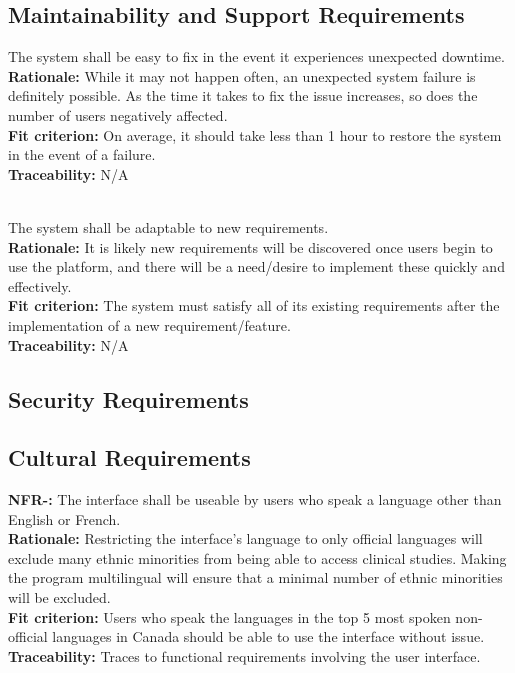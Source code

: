 \documentclass[12pt, titlepage]{article}
\newcounter{NFR_Counter}
\newcounter{FR_Counter}
\begin{document}
\subsection{Maintainability and Support Requirements}


The system shall be easy to fix in the event it experiences unexpected downtime.\\
\textbf{Rationale:}
While it may not happen often, an unexpected system failure is definitely possible. As the time it takes 
to fix the issue increases, so does the number of users negatively affected.\\
\textbf{Fit criterion:}
On average, it should take less than 1 hour to restore the system in the event of a failure.\\
\textbf{Traceability:}
N/A \\~\\
\addtocounter{NFR_Counter}{1}


The system shall be adaptable to new requirements.\\
\textbf{Rationale:}
It is likely new requirements will be discovered once users begin to use the platform, and there will be a need/desire to 
implement these quickly and effectively.\\
\textbf{Fit criterion:}
The system must satisfy all of its existing requirements after the implementation of a new requirement/feature.\\
\textbf{Traceability:}
N/A
\addtocounter{NFR_Counter}{1}


\subsection{Security Requirements}

\subsection{Cultural Requirements}
\noindent\textbf{NFR-\the\value{NFR_Counter}:}
The interface shall be useable by users who speak a language other than English or French.  \\
\textbf{Rationale:}
Restricting the interface's language to only official languages will exclude many ethnic minorities from being able to access clinical studies. Making the program multilingual will ensure that a minimal number of ethnic minorities will be excluded. \\
\textbf{Fit criterion:}
Users who speak the languages in the top 5 most spoken non-official languages in Canada should be able to use the interface without issue. \\
\textbf{Traceability:}
Traces to functional requirements involving the user interface. \\~\\
\addtocounter{NFR_Counter}{1}
\end{document}
